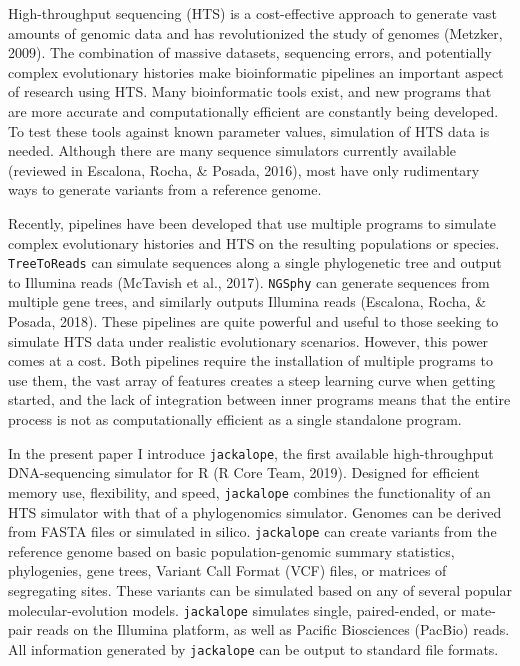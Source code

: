 \documentclass[12pt,]{article}
\begin{document}
High-throughput sequencing (HTS) is a cost-effective approach to generate vast amounts
of genomic data and has revolutionized the study of genomes
(Metzker, 2009).
The combination of massive datasets, sequencing errors, and potentially complex
evolutionary histories make bioinformatic pipelines an important aspect of
research using HTS.
Many bioinformatic tools exist, and new programs that are more accurate and
computationally efficient are constantly being developed.
To test these tools against known parameter values, simulation of HTS data is needed.
Although there are many sequence simulators currently available
(reviewed in Escalona, Rocha, \& Posada, 2016),
most have only rudimentary ways to generate variants from a reference genome.

Recently, pipelines have been developed that use multiple programs
to simulate complex evolutionary histories and HTS on the resulting populations
or species.
\texttt{TreeToReads} can simulate sequences along a single phylogenetic tree and output
to Illumina reads (McTavish et al., 2017).
\texttt{NGSphy} can generate sequences from multiple gene trees, and similarly outputs
Illumina reads (Escalona, Rocha, \& Posada, 2018).
These pipelines are quite powerful and useful to those seeking to simulate
HTS data under realistic evolutionary scenarios.
However, this power comes at a cost.
Both pipelines require the installation of multiple programs to use them,
the vast array of features creates a steep learning curve when getting started,
and the lack of integration between inner programs means that the entire process
is not as computationally efficient as a single standalone program.

In the present paper I introduce \texttt{jackalope}, the first available high-throughput
DNA-sequencing simulator for R
(R Core Team, 2019).
Designed for efficient memory use, flexibility, and speed,
\texttt{jackalope} combines the functionality of an HTS simulator with that of a
phylogenomics simulator.
Genomes can be derived from FASTA files or simulated in silico.
\texttt{jackalope} can create variants from the reference genome based on basic
population-genomic summary statistics, phylogenies, gene trees,
Variant Call Format (VCF) files, or matrices of segregating sites.
These variants can be simulated based on any of several popular
molecular-evolution models.
\texttt{jackalope} simulates single, paired-ended, or mate-pair reads on the Illumina platform,
as well as Pacific Biosciences (PacBio) reads.
All information generated by \texttt{jackalope} can be output to standard file formats.
\end{document}
